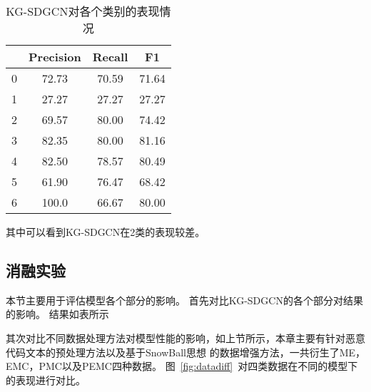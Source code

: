 \begin{table}[htb]
	\renewcommand{\arraystretch}{1.3}
	\caption{KG-SDGCN对各个类别的表现情况}
	\label{tab:task1}
	\vspace{0.5em}\centering\wuhao
	\begin{tabular}{c c c c }
		\toprule[1.5pt]  & Precision & Recall & F1 \\
		\midrule[1pt] 
		0   &  72.73  &  70.59  &  71.64   \\
		1   &  27.27  &  27.27  &  27.27   \\  
		2   &  69.57  &  80.00  &  74.42   \\     
		3   &  82.35  &  80.00  &  81.16   \\     
		4   &  82.50  &  78.57  &  80.49    \\    
		5   &  61.90  &  76.47  &  68.42    \\    
		6   &  100.0  &  66.67  &  80.00    \\     
		\bottomrule[1.5pt] 
	\end{tabular}
\end{table}

其中可以看到KG-SDGCN在2类的表现较差。

\subsection{消融实验}
本节主要用于评估模型各个部分的影响。
首先对比KG-SDGCN的各个部分对结果的影响。
结果如表所示


其次对比不同数据处理方法对模型性能的影响，如上节所示，本章主要有针对恶意代码文本的预处理方法以及基于SnowBall思想
的数据增强方法，一共衍生了ME，EMC，PMC以及PEMC四种数据。
图~\ref{fig:datadiff}~对四类数据在不同的模型下的表现进行对比。

